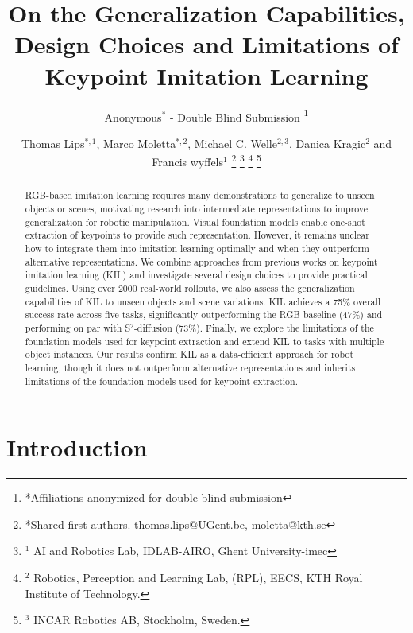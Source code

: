\documentclass[letterpaper, 10 pt, conference]{ieeeconf}  %
\title{\LARGE \bf
On the Generalization Capabilities, Design Choices and Limitations of Keypoint Imitation Learning}
\author{Anonymous$^{*}$ - Double Blind Submission
\thanks{*Affiliations anonymized for double-blind submission}%
}
\author{Thomas Lips$^{*,1}$, Marco Moletta$^{*,2}$, Michael C. Welle$^{2,3}$, Danica Kragic$^{2}$ and Francis wyffels$^{1}$%
\thanks{*Shared first authors. thomas.lips@UGent.be, moletta@kth.se}%
\thanks{$^{1}$ AI and Robotics Lab, IDLAB-AIRO, Ghent University-imec}%
\thanks{$^{2}$ Robotics, Perception and Learning Lab, (RPL), EECS, KTH Royal Institute of Technology.}%
\thanks{$^{3}$ INCAR Robotics AB, Stockholm, Sweden. }%
}
\begin{document}
\maketitle
\thispagestyle{empty}
\pagestyle{empty}


\begin{abstract}
RGB-based imitation learning requires many demonstrations to generalize to unseen objects or scenes, motivating research into intermediate representations to improve generalization for robotic manipulation.
Visual foundation models enable one-shot extraction of keypoints to provide such representation. However, it remains unclear how to integrate them into imitation learning optimally and when they outperform alternative representations.
We combine approaches from previous works on keypoint imitation learning (KIL) and investigate several design choices to provide practical guidelines. Using over 2000 real-world rollouts, we also assess the generalization capabilities of KIL to unseen objects and scene variations. KIL achieves a 75\% overall success rate across five tasks, significantly outperforming the RGB baseline (47\%) and performing on par with S$^2$-diffusion (73\%). Finally, we explore the limitations of the foundation models used for keypoint extraction and extend KIL to tasks with multiple object instances.
Our results confirm KIL as a data-efficient approach for robot learning, though it does not outperform alternative representations and inherits limitations of the foundation models used for keypoint extraction. 
\end{abstract}


\section{Introduction}
\label{sec:introduction}



\end{document}
